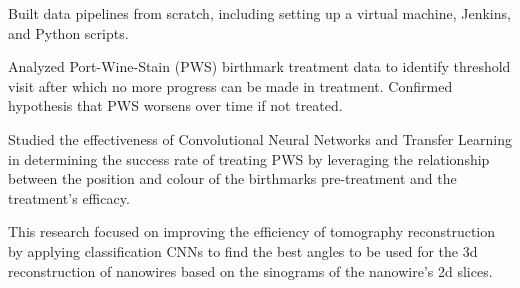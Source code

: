 \documentclass[]{CV}
\begin{document}
\begin{minipage}[t]{0.705\textwidth}
\begin{tightemize}
\item Built data pipelines from scratch, including setting up a virtual machine, Jenkins, and Python scripts.

\quad
\end{tightemize}

\vspace{\topsep}
\begin{tightemize}

\item Analyzed Port-Wine-Stain (PWS) birthmark treatment data to identify threshold visit after which no more progress can be made in treatment. Confirmed hypothesis that PWS worsens over time if not treated.

\item Studied the effectiveness of Convolutional Neural Networks and Transfer Learning in determining the success rate of treating PWS by leveraging the relationship between the position and colour of the birthmarks pre-treatment and the treatment's efficacy.


\end{tightemize}
\sectionsep

\vspace{\topsep} %
\begin{tightemize}
\item This research focused on improving the efficiency of tomography reconstruction by applying classification CNNs to find the best angles to be used for the 3d reconstruction of nanowires based on the sinograms of the nanowire's 2d slices.


\end{tightemize}




\end{minipage}
\end{document}
